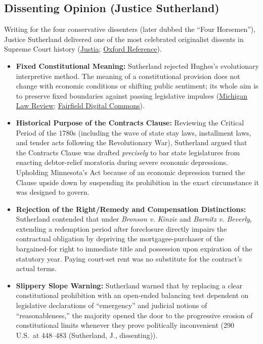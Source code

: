 \documentclass[12pt]{article}
\begin{document}
\subsection{Dissenting Opinion (Justice Sutherland)}

Writing for the four conservative dissenters (later dubbed the ``Four Horsemen''), Justice Sutherland delivered one of the most celebrated originalist dissents in Supreme Court history (\href{https://supreme.justia.com/cases/federal/us/290/398/}{Justia}; \href{https://www.oxfordreference.com/display/10.1093/oi/authority.20110803095942753}{Oxford Reference}).

\begin{itemize}
  \item \textbf{Fixed Constitutional Meaning:} Sutherland rejected Hughes's evolutionary interpretive method. The meaning of a constitutional provision does not change with economic conditions or shifting public sentiment; its whole aim is to preserve fixed boundaries against passing legislative impulses (\href{https://repository.law.umich.edu/cgi/viewcontent.cgi?article=2353&context=mlr}{Michigan Law Review}; \href{https://digitalcommons.fairfield.edu/cgi/viewcontent.cgi?referer=&httpsredir=1&article=1061&context=nealsb}{Fairfield Digital Commons}).
  \item \textbf{Historical Purpose of the Contracts Clause:} Reviewing the Critical Period of the 1780s (including the wave of state stay laws, installment laws, and tender acts following the Revolutionary War), Sutherland argued that the Contracts Clause was drafted \emph{precisely} to bar state legislatures from enacting debtor-relief moratoria during severe economic depressions. Upholding Minnesota's Act because of an economic depression turned the Clause upside down by suspending its prohibition in the exact circumstance it was designed to govern.
  \item \textbf{Rejection of the Right/Remedy and Compensation Distinctions:} Sutherland contended that under \emph{Bronson v. Kinzie} and \emph{Barnitz v. Beverly}, extending a redemption period after foreclosure directly impairs the contractual obligation by depriving the mortgagee-purchaser of the bargained-for right to immediate title and possession upon expiration of the statutory year. Paying court-set rent was no substitute for the contract's actual terms.
  \item \textbf{Slippery Slope Warning:} Sutherland warned that by replacing a clear constitutional prohibition with an open-ended balancing test dependent on legislative declarations of ``emergency'' and judicial notions of ``reasonableness,'' the majority opened the door to the progressive erosion of constitutional limits whenever they prove politically inconvenient (290 U.S.\ at 448--483 (Sutherland, J., dissenting)).
\end{itemize}
\end{document}
